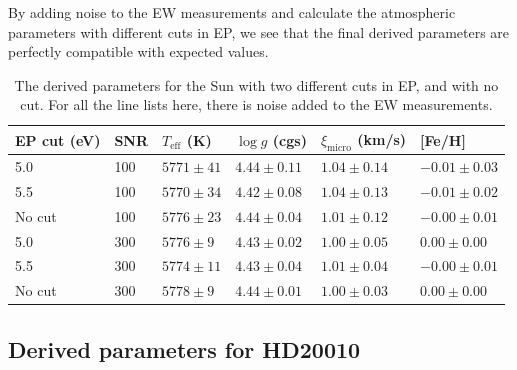 \documentclass{aa}
\begin{document}
By adding noise to the EW measurements and calculate the atmospheric
parameters with different cuts in EP, we see that the final derived parameters
are perfectly compatible with expected values.





\begin{table}[tb!]
    \caption{The derived parameters for the Sun with two different cuts
    in EP, and with no cut. For all the line lists here, there is noise
    added to the EW measurements.}
    \label{tab:sun}
    \centering
    \begin{tabular}{llllll}
      \hline\hline
        EP cut (eV) &  SNR &  $T_\mathrm{eff}$ (K) &  $\log g$ (cgs)     &  $\xi_\mathrm{micro}$ (km/s) &  [Fe/H]           \\
        \hline
        5.0         &  100 &  $5771 \pm  41$       & $4.44   \pm  0.11$  & $1.04  \pm  0.14$            & $-0.01    \pm 0.03$\\
        5.5         &  100 &  $5770 \pm  34$       & $4.42   \pm  0.08$  & $1.04  \pm  0.13$            & $-0.01    \pm 0.02$\\
        No cut      &  100 &  $5776 \pm  23$       & $4.44   \pm  0.04$  & $1.01  \pm  0.12$            & $-0.00    \pm 0.01$\\
        \hline
        5.0         &  300 &  $5776 \pm  9 $       & $4.43   \pm  0.02$  & $1.00  \pm  0.05$            &  $0.00    \pm 0.00$\\
        5.5         &  300 &  $5774 \pm  11$       & $4.43   \pm  0.04$  & $1.01  \pm  0.04$            & $-0.00    \pm 0.01$\\
        No cut      &  300 &  $5778 \pm  9 $       & $4.44   \pm  0.01$  & $1.00  \pm  0.03$            &  $0.00    \pm 0.00$\\
      \hline
    \end{tabular}
\end{table}




\subsection{Derived parameters for HD20010}
\label{sec:derived_parameters_of_hd20010}
\end{document}

